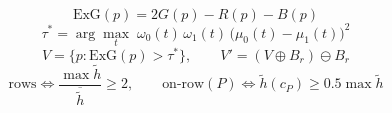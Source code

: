 \documentclass[varwidth=17cm,border=10pt]{standalone}
\begin{document}
\Large
$$\mathrm{ExG}(p)=2G(p)-R(p)-B(p)$$
$$\tau^\ast=\arg\max_t\;\omega_0(t)\,\omega_1(t)\,\bigl(\mu_0(t)-\mu_1(t)\bigr)^2$$
$$V=\{p:\mathrm{ExG}(p)>\tau^\ast\},\qquad V'=(V\oplus B_r)\ominus B_r$$
$$\text{rows}\iff \frac{\max\tilde h}{\overline{\tilde h}}\ge 2,\qquad \text{on-row}(P)\iff \tilde h(c_P)\ge 0.5\max\tilde h$$
\end{document}
